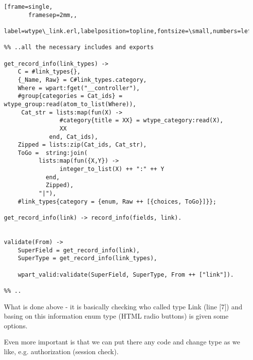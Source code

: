\begin{Verbatim}[frame=single,
       framesep=2mm,,
       label=wtype\_link.erl,labelposition=topline,fontsize=\small,numbers=left]

%% ..all the necessary includes and exports

get_record_info(link_types) -> 
    C = #link_types{},
    {_Name, Raw} = C#link_types.category,
    Where = wpart:fget("__controller"),
    #group{categories = Cat_ids} = wtype_group:read(atom_to_list(Where)),
     Cat_str = lists:map(fun(X) -> 
				#category{title = XX} = wtype_category:read(X), 
				XX  
			 end, Cat_ids),
    Zipped = lists:zip(Cat_ids, Cat_str),
    ToGo =  string:join(
	      lists:map(fun({X,Y}) ->
				integer_to_list(X) ++ ":" ++ Y 
			end, 
			Zipped),
	      "|"),
    #link_types{category = {enum, Raw ++ [{choices, ToGo}]}};

get_record_info(link) -> record_info(fields, link).


validate(From) -> 
    SuperField = get_record_info(link),
    SuperType = get_record_info(link_types),

    wpart_valid:validate(SuperField, SuperType, From ++ ["link"]).

%% ..
\end{Verbatim}

What is done above - it is basically checking who called type Link (line [7]) and basing on
this information enum type (HTML radio buttons) is given some options.

Even more important is that we can put there any code and change type as we
like, e.g. authorization (session check). 
